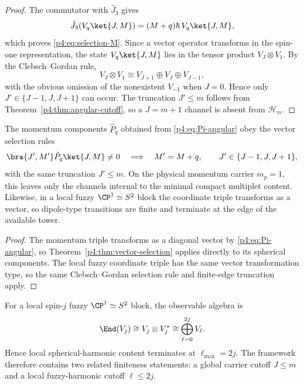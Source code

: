 \documentclass[12pt,a4paper]{article}
\begin{document}
\begin{proof}
The commutator with \(\hat J_3\) gives
\[
\hat J_3(V_q\ket{J,M})=(M+q)\hbar\,V_q\ket{J,M},
\]
which proves \eqref{p4:eq:selection-M}.
Since a vector operator transforms in the spin-one representation, the state \(V_q\ket{J,M}\) lies in the tensor product \(V_J\otimes V_1\).
By the Clebsch--Gordan rule,
\[
V_J\otimes V_1\cong V_{J+1}\oplus V_J\oplus V_{J-1},
\]
with the obvious omission of the nonexistent \(V_{-1}\) when \(J=0\).
Hence only \(J'\in\{J-1,J,J+1\}\) can occur.
The truncation \(J'\le m\) follows from Theorem~\ref{p4:thm:angular-cutoff}, so a \(J=m+1\) channel is absent from \(\mathcal H_m\).
\end{proof}

\begin{corollary}
\label{p4:cor:momentum-selection}
The momentum components \(\hat P_q\) obtained from \eqref{p4:eq:Pi-angular} obey the vector selection rules
\begin{equation}
\bra{J',M'}\hat P_q\ket{J,M}\neq 0
\quad\Longrightarrow\quad
M'=M+q,
\qquad
J'\in\{J-1,J,J+1\},
\end{equation}
with the same truncation \(J'\le m\).
On the physical momentum carrier \(m_p=1\), this
leaves only the channels internal to the minimal compact multiplet content.
Likewise, in a local fuzzy \(\CP^1\simeq S^2\) block the coordinate triple transforms as a vector, so dipole-type transitions are finite and terminate at the edge of the available tower.
\end{corollary}

\begin{proof}
The momentum triple transforms as a diagonal vector by \eqref{p4:eq:Pi-angular}, so Theorem~\ref{p4:thm:vector-selection} applies directly to its spherical components.  The local fuzzy coordinate triple has the same vector transformation type, so the same Clebsch--Gordan selection rule and finite-edge truncation apply.
\end{proof}


\begin{remark}
\label{p4:rem:fuzzy-harmonic-cutoff}
For a local spin-\(j\) fuzzy \(\CP^1\simeq S^2\) block, the observable algebra is
\begin{equation}
\label{p4:eq:endvj-decomp}
\End(V_j)
\cong
V_j\otimes V_j^*
\cong
\bigoplus_{\ell=0}^{2j}V_\ell.
\end{equation}
Hence local spherical-harmonic content terminates at \(\ell_{\max}=2j\).
The framework therefore contains two related finiteness statements: a global carrier cutoff \(J\le m\) and a local fuzzy-harmonic cutoff \(\ell\le 2j\).
\end{remark}
\end{document}
